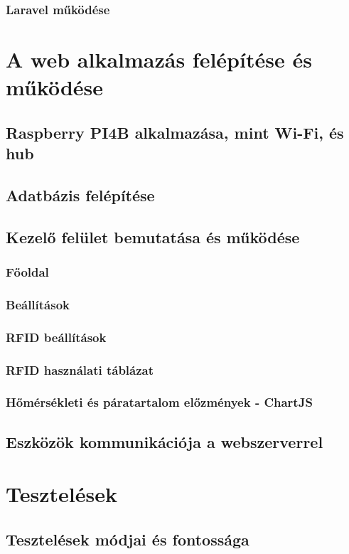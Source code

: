 \documentclass[
]{thesis-ekf}
\theoremstyle{definition}
\theoremstyle{remark}
\begin{document}
	\subsection{Laravel működése}
	
	\chapter{A web alkalmazás felépítése és működése}
	\section{Raspberry PI4B alkalmazása, mint Wi-Fi, és hub}
	\section{Adatbázis felépítése}
	\section{Kezelő felület bemutatása és működése}
	\subsection{Főoldal}
	\subsection{Beállítások}
	\subsection{RFID beállítások}
	\subsection{RFID használati táblázat}
	\subsection{Hőmérsékleti és páratartalom előzmények - ChartJS}
	\section{Eszközök kommunikációja a webszerverrel}
	
	\chapter{Tesztelések}
	\section{Tesztelések módjai és fontossága}
	
\end{document}
